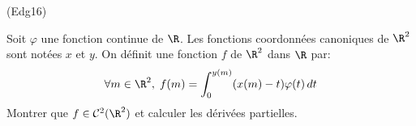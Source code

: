 \begin{tiny}(Edg16)\end{tiny} Soit $\varphi$ une fonction continue de $\R$. Les fonctions coordonnées canoniques de $\R^2$ sont notées $x$ et $y$. On définit une fonction $f$ de $\R^2$ dans $\R$ par:
\begin{displaymath}
 \forall m\in \R^2,\;
f(m)=\int_0^{y(m)}(x(m)-t)\varphi(t)\,dt
\end{displaymath}
 Montrer que $f\in \mathcal{C}^2(\R^2)$ et calculer les dérivées partielles.